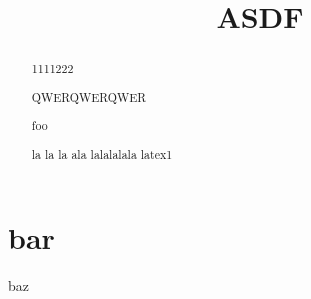 \documentclass[a4paper,10pt]{article}
\title{ASDF}
\author{}
\begin{document}
\maketitle

\begin{abstract}

  1111222
  
  QWERQWERQWER

  foo

la la la ala lalalalala latex1
\end{abstract}

\section{bar}
baz
\end{document}
